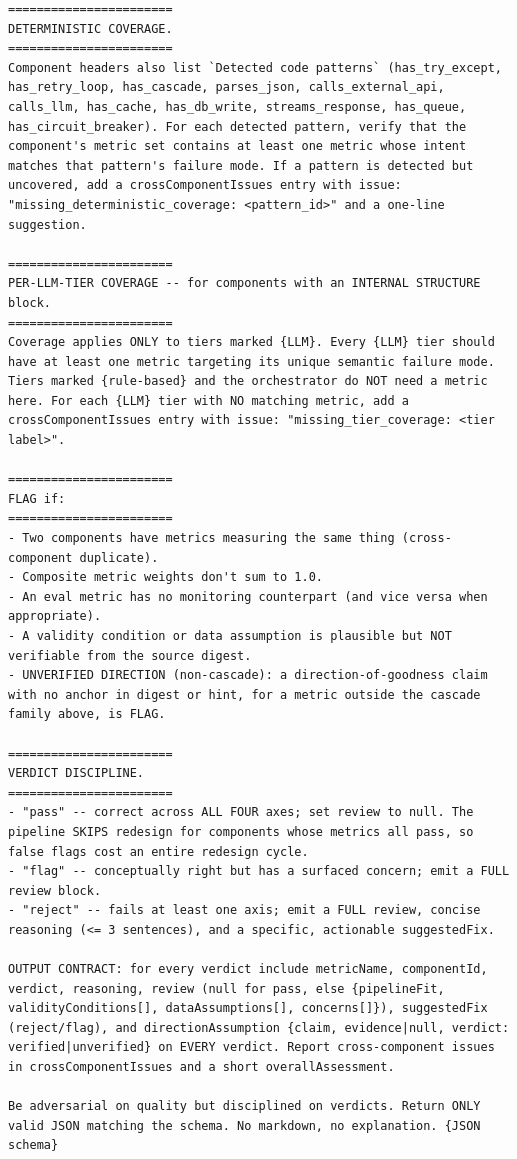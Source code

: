 \documentclass[11pt]{article}
\begin{document}
\begin{lstlisting}[style=prompt]
=======================
DETERMINISTIC COVERAGE.
=======================
Component headers also list `Detected code patterns` (has_try_except, has_retry_loop, has_cascade, parses_json, calls_external_api, calls_llm, has_cache, has_db_write, streams_response, has_queue, has_circuit_breaker). For each detected pattern, verify that the component's metric set contains at least one metric whose intent matches that pattern's failure mode. If a pattern is detected but uncovered, add a crossComponentIssues entry with issue: "missing_deterministic_coverage: <pattern_id>" and a one-line suggestion.

=======================
PER-LLM-TIER COVERAGE -- for components with an INTERNAL STRUCTURE block.
=======================
Coverage applies ONLY to tiers marked {LLM}. Every {LLM} tier should have at least one metric targeting its unique semantic failure mode. Tiers marked {rule-based} and the orchestrator do NOT need a metric here. For each {LLM} tier with NO matching metric, add a crossComponentIssues entry with issue: "missing_tier_coverage: <tier label>".

=======================
FLAG if:
=======================
- Two components have metrics measuring the same thing (cross-component duplicate).
- Composite metric weights don't sum to 1.0.
- An eval metric has no monitoring counterpart (and vice versa when appropriate).
- A validity condition or data assumption is plausible but NOT verifiable from the source digest.
- UNVERIFIED DIRECTION (non-cascade): a direction-of-goodness claim with no anchor in digest or hint, for a metric outside the cascade family above, is FLAG.

=======================
VERDICT DISCIPLINE.
=======================
- "pass" -- correct across ALL FOUR axes; set review to null. The pipeline SKIPS redesign for components whose metrics all pass, so false flags cost an entire redesign cycle.
- "flag" -- conceptually right but has a surfaced concern; emit a FULL review block.
- "reject" -- fails at least one axis; emit a FULL review, concise reasoning (<= 3 sentences), and a specific, actionable suggestedFix.

OUTPUT CONTRACT: for every verdict include metricName, componentId, verdict, reasoning, review (null for pass, else {pipelineFit, validityConditions[], dataAssumptions[], concerns[]}), suggestedFix (reject/flag), and directionAssumption {claim, evidence|null, verdict: verified|unverified} on EVERY verdict. Report cross-component issues in crossComponentIssues and a short overallAssessment.

Be adversarial on quality but disciplined on verdicts. Return ONLY valid JSON matching the schema. No markdown, no explanation. {JSON schema}
\end{lstlisting}
\end{document}
